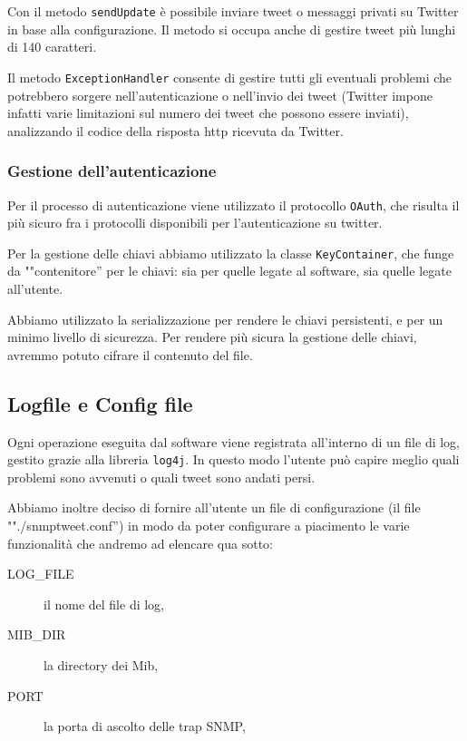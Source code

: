 \documentclass[a4paper, 10pt]{article}
\begin{document}
Con il metodo \texttt{sendUpdate} \`e possibile inviare tweet o messaggi privati su Twitter in base alla configurazione. Il metodo si occupa anche di gestire tweet pi\`u lunghi di 140 caratteri.

Il metodo \texttt{ExceptionHandler} consente di gestire tutti gli eventuali problemi che potrebbero sorgere nell'autenticazione o nell'invio dei tweet (Twitter impone infatti varie limitazioni sul numero dei tweet che possono essere inviati), analizzando il codice della risposta http ricevuta da Twitter.

\subsubsection{Gestione dell'autenticazione}

Per il processo di autenticazione viene utilizzato il protocollo \texttt{OAuth}, che risulta il pi\`u sicuro fra i protocolli disponibili per l'autenticazione su twitter.

Per la gestione delle chiavi abbiamo utilizzato la classe \texttt{KeyContainer}, che funge da ""contenitore'' per le chiavi: sia per quelle legate al software, sia quelle legate all'utente.

Abbiamo utilizzato la serializzazione per rendere le chiavi persistenti, e per un minimo livello di sicurezza. Per rendere pi\`u sicura la gestione delle chiavi, avremmo potuto cifrare il contenuto del file.

\subsection{Logfile e Config file}

Ogni operazione eseguita dal software viene registrata all'interno di un file di log, gestito grazie alla libreria \texttt{log4j}. In questo modo l'utente pu\`o capire meglio quali problemi sono avvenuti o quali tweet sono andati persi.

Abbiamo inoltre deciso di fornire all'utente un file di configurazione (il file ""./snmptweet.conf'') in modo da poter configurare a piacimento le varie funzionalit\`a che andremo ad elencare qua sotto:

\begin{description}
	\item[LOG\_FILE] il nome del file di log,
	\item[MIB\_DIR] la directory dei Mib,
	\item[PORT] la porta di ascolto delle trap SNMP,
\end{description}
\end{document}
